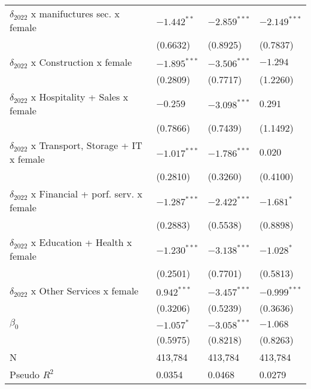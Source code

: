 \begin{table}[h!]
{{\begin{tabular}{llll}
$\delta_{2022}$ x manifuctures sec. x female       &      $-1.442^{**}$ &     $-2.859^{***}$ &     $-2.149^{***}$ \\
                                                   &           (0.6632) &           (0.8925) &           (0.7837) \\
$\delta_{2022}$ x Construction x female            &     $-1.895^{***}$ &     $-3.506^{***}$ &           $-1.294$ \\
                                                   &           (0.2809) &           (0.7717) &           (1.2260) \\
$\delta_{2022}$ x Hospitality + Sales x female     &           $-0.259$ &     $-3.098^{***}$ &            $0.291$ \\
                                                   &           (0.7866) &           (0.7439) &           (1.1492) \\
$\delta_{2022}$ x Transport, Storage + IT x female &     $-1.017^{***}$ &     $-1.786^{***}$ &            $0.020$ \\
                                                   &           (0.2810) &           (0.3260) &           (0.4100) \\
$\delta_{2022}$ x Financial + porf. serv. x female &     $-1.287^{***}$ &     $-2.422^{***}$ &         $-1.681^*$ \\
                                                   &           (0.2883) &           (0.5538) &           (0.8898) \\
$\delta_{2022}$ x Education + Health x female      &     $-1.230^{***}$ &     $-3.138^{***}$ &         $-1.028^*$ \\
                                                   &           (0.2501) &           (0.7701) &           (0.5813) \\
$\delta_{2022}$ x Other Services x female          &      $0.942^{***}$ &     $-3.457^{***}$ &     $-0.999^{***}$ \\
                                                   &           (0.3206) &           (0.5239) &           (0.3636) \\
$\beta_0$                                          &         $-1.057^*$ &     $-3.058^{***}$ &           $-1.068$ \\
                                                   &           (0.5975) &           (0.8218) &           (0.8263) \\
\midrule
N                                                  &            413,784 &            413,784 &            413,784 \\
Pseudo $R^2$                                       &             0.0354 &             0.0468 &             0.0279 \\
\bottomrule
\end{tabular}
}}
\end{table}